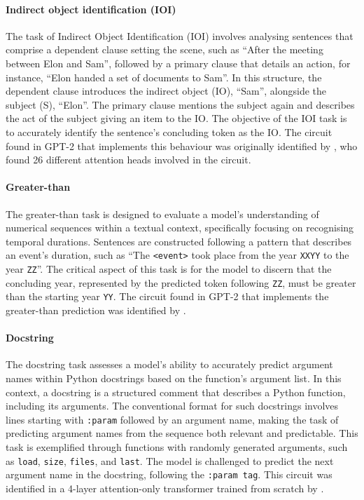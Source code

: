 \documentclass[11pt]{scrartcl}
\begin{document}
\paragraph{Indirect object identification (IOI)}

The task of Indirect Object Identification (IOI) involves analysing sentences that comprise a dependent clause setting the scene, such as ``After the meeting between Elon and Sam'', followed by a primary clause that details an action, for instance, ``Elon handed a set of documents to Sam''. In this structure, the dependent clause introduces the indirect object (IO), ``Sam'', alongside the subject (S), ``Elon''. The primary clause mentions the subject again and describes the act of the subject giving an item to the IO. The objective of the IOI task is to accurately identify the sentence's concluding token as the IO. The circuit found in GPT-2 that implements this behaviour was originally identified by \citet{wang2022interpretability}, who found 26 different attention heads involved in the circuit.


\paragraph{Greater-than}

The greater-than task is designed to evaluate a model's understanding of numerical sequences within a textual context, specifically focusing on recognising temporal durations. Sentences are constructed following a pattern that describes an event's duration, such as ``The \texttt{<event>} took place from the year \texttt{XXYY} to the year \texttt{ZZ}''. The critical aspect of this task is for the model to discern that the concluding year, represented by the predicted token following \texttt{ZZ}, must be greater than the starting year \texttt{YY}. The circuit found in GPT-2 that implements the greater-than prediction was identified by \citet{hanna2024does}.

\paragraph{Docstring}

The docstring task assesses a model's ability to accurately predict argument names within Python docstrings based on the function's argument list. In this context, a docstring is a structured comment that describes a Python function, including its arguments. The conventional format for such docstrings involves lines starting with \texttt{:param} followed by an argument name, making the task of predicting argument names from the sequence both relevant and predictable. This task is exemplified through functions with randomly generated arguments, such as \texttt{load}, \texttt{size}, \texttt{files}, and \texttt{last}. The model is challenged to predict the next argument name in the docstring, following the \texttt{:param tag}. This circuit was identified in a 4-layer attention-only transformer trained from scratch by \citet{heimersheim2023circuit}.
\end{document}
